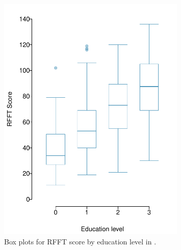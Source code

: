\begin{figure}[h!]
	\centering
	\includegraphics[width=0.8\textwidth]
	{ch_multiple_linear_regression_oi_biostat/figures/prevendRFFTEducBoxPlot/prevendRFFTEducBoxPlot.pdf}
	\caption{Box plots for RFFT score by education level in .}
	\label{prevendRFFTEducBoxPlot}
\end{figure}

